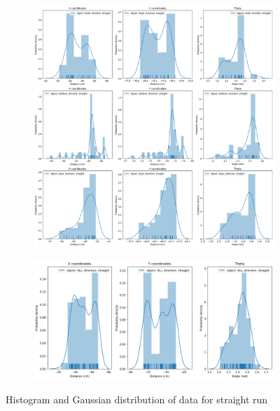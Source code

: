 \documentclass[10pt,a4paper]{article}
\begin{document}
					\begin{figure}[H]
						\begin{subfigure}{\textwidth}
							\centering
							\includegraphics[width=\linewidth]{img/st_hist.png}							
						\end{subfigure}
						\begin{subfigure}{\textwidth}
							\centering
							\includegraphics[width=\linewidth]{img/st_hist_combined.png}
						\end{subfigure}
						\caption{Histogram and Gaussian distribution of data for straight run}
					\end{figure}
\end{document}
